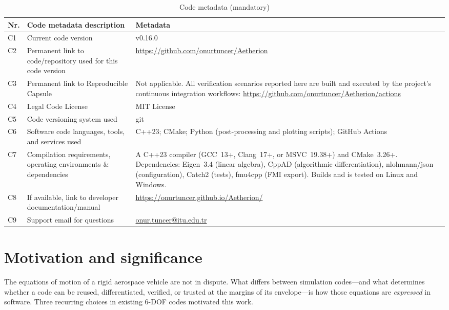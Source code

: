 \documentclass[preprint,12pt,a4paper]{elsarticle}
\begin{document}
\begin{table}[H]
\footnotesize
\begin{tabular}{|l|p{4.9cm}|p{6.9cm}|}
\hline
\textbf{Nr.} & \textbf{Code metadata description} & \textbf{Metadata} \\
\hline
C1 & Current code version & v0.16.0 \\
\hline
C2 & Permanent link to code/repository used for this code version &
     \url{https://github.com/onurtuncer/Aetherion} \\
\hline
C3 & Permanent link to Reproducible Capsule &
     Not applicable. All verification scenarios reported here are built and
     executed by the project's continuous integration workflows:
     \url{https://github.com/onurtuncer/Aetherion/actions} \\
\hline
C4 & Legal Code License & MIT License \\
\hline
C5 & Code versioning system used & git \\
\hline
C6 & Software code languages, tools, and services used &
     C++23; CMake; Python (post-processing and plotting scripts);
     GitHub Actions \\
\hline
C7 & Compilation requirements, operating environments \& dependencies &
     A C++23 compiler (GCC~13+, Clang~17+, or MSVC~19.38+) and CMake~3.26+.
     Dependencies: Eigen~3.4 (linear algebra), CppAD (algorithmic
     differentiation), nlohmann/json (configuration), Catch2 (tests),
     fmu4cpp (FMI export). Builds and is tested on Linux and Windows. \\
\hline
C8 & If available, link to developer documentation/manual &
     \url{https://onurtuncer.github.io/Aetherion/} \\
\hline
C9 & Support email for questions & \url{onur.tuncer@itu.edu.tr} \\
\hline
\end{tabular}
\caption{Code metadata (mandatory)}
\label{codeMetadata}
\end{table}

\newpage

\section{Motivation and significance}
\label{sec:motivation}

The equations of motion of a rigid aerospace vehicle are not in dispute. What
differs between simulation codes---and what determines whether a code can be
reused, differentiated, verified, or trusted at the margins of its
envelope---is how those equations are \emph{expressed} in software. Three
recurring choices in existing 6-DOF codes motivated this work.
\end{document}

